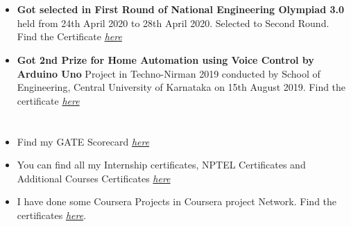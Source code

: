 \documentclass[]{article}
\begin{document}
\section*{\color{blue}{Awards/Participations/Selections}}
   \begin{itemize}
   \item \textbf{Got selected in First Round of National Engineering Olympiad 3.0} held from 24th April 2020 to 28th April 2020. Selected to Second Round. Find the Certificate \href{https://drive.google.com/drive/u/0/folders/1afmjGeQ6c10q58FP6xpgcYjkM3Um7R69}{\em here}
     \item \textbf{Got 2nd Prize for Home Automation using Voice Control by Arduino Uno} Project in Techno-Nirman 2019 conducted by School of Engineering, Central University of Karnataka on 15th August 2019. Find the certificate \href{https://drive.google.com/file/d/1gPYqmU3ETYQdZBCdEvzVyUp55GT4LPBs/view?usp=sharing}{\em here}
   \end{itemize}
\section*{\color{blue}{Other Links}}
    \begin{itemize}
	\item Find my GATE Scorecard \href{https://drive.google.com/drive/folders/11RDjP2MJ5MHqZlXpzrzX8gFm-TfcGO2r?usp=sharing}{\em here}
    \item You can find all my Internship certificates, NPTEL Certificates and Additional Courses Certificates \href{https://drive.google.com/drive/folders/1afmjGeQ6c10q58FP6xpgcYjkM3Um7R69?usp=sharing}{\em here}
    \item I have done some Coursera Projects in Coursera project Network. Find the certificates \href{https://drive.google.com/drive/u/0/folders/187CiSJKh_43Vlr-XUnmirNDy3oFicABx}{\em here}.
    \end{itemize}
\end{document}
